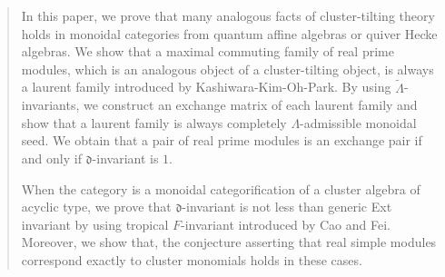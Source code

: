 \begin{abstract}
In this paper, we prove that many analogous facts of cluster-tilting theory holds in 
monoidal categories from quantum affine algebras or quiver Hecke algebras. 
We show that a maximal commuting family of real prime modules, 
which is an analogous object of a cluster-tilting object, 
is always a laurent family 
introduced by Kashiwara-Kim-Oh-Park. 
By using $\widetilde{\Lambda}$-invariants, we construct an exchange matrix of each laurent family 
and show that a laurent family is always completely $\Lambda$-admissible monoidal seed. 
We obtain that a pair of real prime modules is an exchange pair
if and only if $\mathfrak{d}$-invariant is $1$. 

When the category is a monoidal categorification of a cluster algebra of acyclic type, 
we prove that $\mathfrak{d}$-invariant is not less than generic Ext invariant by using 
tropical $F$-invariant introduced by Cao and Fei. 
Moreover, we show that, the conjecture asserting that real simple modules correspond 
exactly to cluster monomials holds in these cases. 
\end{abstract} 
